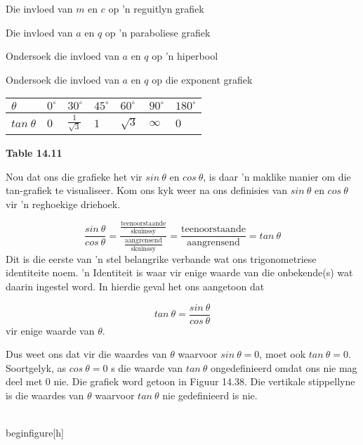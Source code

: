 \begin{Ondersoek}{Die invloed van $m$ en $c$ op 'n reguitlyn grafiek}
\begin{Ondersoek}{Die invloed van $a$ en $q$ op 'n paraboliese grafiek}
\begin{Ondersoek}{Ondersoek die invloed van $a$ en $q$ op 'n hiperbool}
\begin{Ondersoek}{Ondersoek die invloed van $a$ en $q$ op die exponent grafiek}
\begin{table}[H]
\begin{center}
\begin{tabular}[t]{|l|l|l|l|l|l|l|}\hline
$\theta $&
${0}^{\circ }$&
${30}^{\circ }$&
${45}^{\circ }$&
${60}^{\circ }$&
${90}^{\circ }$&
${180}^{\circ }$
\\ \hline
$tan~\theta $&
$0$ &
$\frac{1}{\sqrt{3}}$&
$1$ &
$\sqrt{3}$&
$\infty $&
$0$%
\\ \hline
\end{tabular}
\end{center}
\begin{center}{\small\bfseries Table 14.11}\end{center}
\end{table}
\par
Nou dat ons die grafieke het vir $sin~\theta $ en $cos~\theta $, is daar ’n maklike manier om die tan-grafiek te visualiseer. Kom ons
kyk weer na ons definisies van $sin~\theta $ en $cos~\theta $ vir ’n reghoekige driehoek.\par 
\nopagebreak\noindent{}
\begin{equation*}
\frac{sin~\theta }{cos~\theta }=\frac{\frac{\mbox{teenoorstaande}}{\mbox{skuinssy}}}{\frac{\mbox{aangrensend}}{\mbox{skuinssy}}}=\frac{\mbox{teenoorstaande}}{\mbox{aangrensend}}=tan~\theta 
\end{equation*}
Dit is die eerste van ’n stel belangrike verbande wat ons trigonometriese identiteite noem. ’n Identiteit is waar vir
enige waarde van die onbekende(s) wat daarin ingestel word. In hierdie geval het ons aangetoon dat\par 
\nopagebreak\noindent{}
\begin{equation*}
tan~\theta =\frac{sin~\theta }{cos~\theta }
\end{equation*}
vir enige waarde van $\theta $.\par 
Dus weet ons dat vir die waardes van $\theta $  waarvoor $sin~\theta =0$, moet ook  $tan~\theta =0$. Soortgelyk, as $cos~\theta =0$ s die
waarde van $tan~\theta $  ongedefinieerd omdat ons nie mag deel met $0$ nie. Die grafiek word getoon in Figuur 14.38. Die
vertikale stippellyne is die waardes van $\theta $  waarvoor $tan~\theta $ nie gedefinieerd is nie.\par 
\setcounter{subfigure}{0}
\\begin{figure}[h]

\end{Ondersoek}
\end{Ondersoek}
\end{Ondersoek}
\end{Ondersoek}
